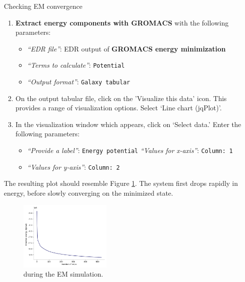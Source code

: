 \documentclass[twocolumn]{bmcart}%
\providecommand{\tightlist}{%
  \setlength{\itemsep}{0pt}\setlength{\parskip}{0pt}}
\begin{document}
\begin{handson_box_colour}{Checking EM convergence}
\begin{enumerate}
\def\labelenumi{\arabic{enumi}.}
\tightlist
\item
  \textbf{Extract energy components with GROMACS} with the following parameters:

  \begin{itemize}
  \tightlist
  \item
    \emph{``EDR file''}: EDR output of
    \textbf{GROMACS energy minimization}
  \item
    \emph{``Terms to calculate''}: \texttt{Potential}
  \item
    \emph{``Output format''}:
    \texttt{Galaxy tabular}

  \end{itemize}
\item
  On the output tabular file, click on the 'Visualize this data' icon. This provides a range of visualization options. Select `Line chart (jqPlot)'.
\item
  In the visualization window which appears, click on `Select data.' Enter the following parameters:
  \begin{itemize}
  \tightlist
  \item
    \emph{``Provide a label''}: \texttt{Energy potential}
    \emph{``Values for x-axis''}: \texttt{Column: 1}
  \item
    \emph{``Values for y-axis''}: \texttt{Column: 2}
  \end{itemize}
\end{enumerate}

\end{handson_box_colour}

The resulting plot should resemble Figure \ref{fig:empot}. The system first drops rapidly in energy, before slowly converging on the minimized state.

\begin{figure}[ht!]
  \includegraphics[width=0.4\textwidth]{em_potential}
  \caption{
       during the EM simulation.}
  \label{fig:empot}
\end{figure}
\end{document}
